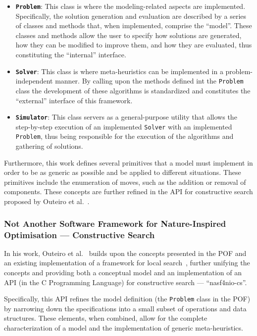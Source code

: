 \begin{itemize}
      \item \textbf{\texttt{Problem}}: This class is where the modeling-related
            aspects are implemented. Specifically, the solution generation and
            evaluation are described by a series of classes and methods that, when
            implemented, comprise the ``model''. These classes and methods allow the user
            to specify how solutions are generated, how they can be modified to improve
            them, and how they are evaluated, thus constituting the ``internal'' interface.
      \item \textbf{\texttt{Solver}}: This class is where meta-heuristics can be implemented in
            a problem-independent manner. By calling upon the methods defined int the \texttt{Problem}
            class the development of these algorithms is standardized and constitutes the ``external''
            interface of this framework.
      \item \textbf{\texttt{Simulator}}: This class servers as a general-purpose utility
            that allows the step-by-step execution of an implemented \texttt{Solver} with an
            implemented \texttt{Problem}, thus being responsible for the execution of the
            algorithms and gathering of solutions.
\end{itemize}

Furthermore, this work defines several primitives that a model must implement in
order to be as generic as possible and be applied to different situations. These
primitives include the enumeration of moves, such as the addition or removal of
components. These concepts are further refined in the API for constructive
search proposed by Outeiro et al.~\cite{outeiro2021application}.

\subsubsection{Not Another Software Framework for Nature-Inspired Optimisation
      --- Constructive Search}

In his work, Outeiro et al.~\cite{outeiro2021application} builds upon the
concepts presented in the POF and an existing implementation of a framework for
local search~\cite{fonseca2021nasf4nio}, further unifying the concepts and
providing both a conceptual model and an implementation of an API (in the C
Programming Language) for constructive search --- ``nasf4nio-cs''.

Specifically, this API refines the model definition (the \texttt{Problem} class
in the POF) by narrowing down the specifications into a small subset of
operations and data structures. These elements, when combined, allow for the
complete characterization of a model and the implementation of generic
meta-heuristics.

